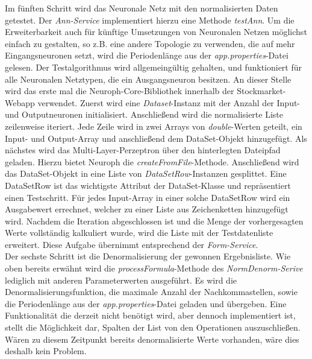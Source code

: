 Im fünften Schritt wird das Neuronale Netz mit den normalisierten Daten getestet. Der \emph{Ann-Service} implementiert hierzu eine Methode \emph{testAnn}. Um die Erweiterbarkeit auch für künftige Umsetzungen von Neuronalen Netzen möglichst einfach zu gestalten, so z.B. eine andere Topologie zu verwenden, die auf mehr Eingangsneuronen setzt, wird die Periodenlänge aus der \emph{app.properties}-Datei gelesen. Der Testalgorithmus wird allgemeingültig gehalten, und funktioniert für alle Neuronalen Netztypen, die ein Ausgangsneuron besitzen. 
An dieser Stelle wird das erste mal die Neuroph-Core-Bibliothek innerhalb der Stockmarket-Webapp verwendet. 
Zuerst wird eine \emph{Dataset}-Instanz mit der Anzahl der Input- und Outputneuronen initialisiert.
Anschließend wird die normalisierte Liste zeilenweise iteriert. Jede Zeile wird in zwei Arrays von \emph{double}-Werten geteilt, ein Input- und Output-Array und anschließend dem DataSet-Objekt hinzugefügt.
Als nächstes wird das Multi-Layer-Perzeptron über den hinterlegten Dateipfad geladen. Hierzu bietet Neuroph die \emph{createFromFile}-Methode.
Anschließend wird das DataSet-Objekt in eine Liste von \emph{DataSetRow}-Instanzen gesplittet. Eine DataSetRow ist das wichtigste Attribut der DataSet-Klasse und repräsentiert einen Testschritt. Für jedes Input-Array in einer solche DataSetRow wird ein Ausgabewert errechnet, welcher zu einer Liste aus Zeichenketten hinzugefügt wird.
Nachdem die Iteration abgeschlossen ist und die Menge der vorhergesagten Werte vollständig kalkuliert wurde, wird die Liste mit der Testdatenliste erweitert. Diese Aufgabe übernimmt entsprechend der \emph{Form-Service}.\\

Der sechste Schritt ist die Denormalisierung der gewonnen Ergebnisliste. Wie oben bereits erwähnt wird die \emph{processFormula}-Methode des \emph{NormDenorm-Serive} lediglich mit anderen Parameterwerten ausgeführt. Es wird die Denormalisierungsfunktion, die maximale Anzahl der Nachkommastellen, sowie die Periodenlänge aus der \emph{app.properties}-Datei geladen und übergeben. Eine Funktionalität die derzeit nicht benötigt wird, aber dennoch implementiert ist, stellt die Möglichkeit dar, Spalten der List von den Operationen auszuschließen. Wären zu diesem Zeitpunkt bereits denormalisierte Werte vorhanden, wäre dies deshalb kein Problem.

